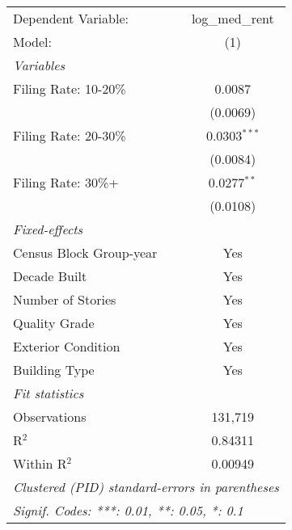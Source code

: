\begingroup
\centering
\begin{tabular}{lc}
   \tabularnewline \midrule \midrule
   Dependent Variable:     & log\_med\_rent\\    
   Model:                  & (1)\\  
   \midrule
   \emph{Variables}\\
   Filing Rate: 10-20\%    & 0.0087\\   
                           & (0.0069)\\   
   Filing Rate: 20-30\%    & 0.0303$^{***}$\\   
                           & (0.0084)\\   
   Filing Rate: 30\%+      & 0.0277$^{**}$\\   
                           & (0.0108)\\   
   \midrule
   \emph{Fixed-effects}\\
   Census Block Group-year & Yes\\  
   Decade Built            & Yes\\  
   Number of Stories       & Yes\\  
   Quality Grade           & Yes\\  
   Exterior Condition      & Yes\\  
   Building Type           & Yes\\  
   \midrule
   \emph{Fit statistics}\\
   Observations            & 131,719\\  
   R$^2$                   & 0.84311\\  
   Within R$^2$            & 0.00949\\  
   \midrule \midrule
   \multicolumn{2}{l}{\emph{Clustered (PID) standard-errors in parentheses}}\\
   \multicolumn{2}{l}{\emph{Signif. Codes: ***: 0.01, **: 0.05, *: 0.1}}\\
\end{tabular}
\par\endgroup
